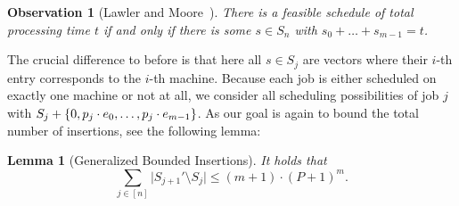 \documentclass[10pt,a4paper]{article}
\newtheorem{lemma}{Lemma}[section]
\newtheorem{observation}{Observation}[section]
\DeclarePairedDelimiter\set{\lbrace}{\rbrace}
\begin{document}
\begin{observation}[Lawler and Moore~\cite{LawlerM69}]
    \label{obs:generalized-s-sets}
    There is a feasible schedule of total processing time $t$ if and only if there is some $s \in S_n$ with $s_0 + \dots + s_{m-1} = t$.
\end{observation}

The crucial difference to before is that here all $s \in S_{j}$ are vectors where their $i$-th entry corresponds to the $i$-th machine.
Because each job is either scheduled on exactly one machine or not at all, we consider all scheduling possibilities of job $j$ with $S_{j} + \set{0, p_j \cdot e_0, \dots, p_j \cdot e_{m-1}}$.
As our goal is again to bound the total number of insertions, see the following lemma:

\begin{lemma}[Generalized Bounded Insertions]
    \label{lem:generalized-bounded-insertions}
    It holds that
    \[
        \sum_{j \in [n]} \big|S_{j+1}' \setminus S_{j}\big| \leq (m+1)  \cdot (P+1)^m.
    \]
\end{lemma}
\end{document}
